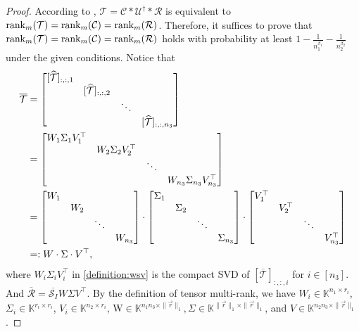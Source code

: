 \documentclass[twoside,12pt]{article}
\def\rank{\textnormal{rank}}
\def\X{\mathcal{T}}
\def\mcR{\mathcal{R}}
\def\mcC{\mathcal{C}}
\def\rank{\textnormal{rank}}
\def\X{\mathcal{T}}
\def\mcR{\mathcal{R}}
\def\mcC{\mathcal{C}}
\begin{document}
\begin{proof}
According to ,   $\mathcal{T}=\mcC*\mathcal{U}^\dagger*\mcR$ is equivalent to  $ \rank_m(\X)=\rank_m(\mcC)=\rank_m(\mcR)$. 
Therefore, it suffices to prove that $\rank_m(\X)=\rank_m(\mcC)=\rank_m(\mcR)$ holds with probability at least $1-\frac{1}{n_1^{\beta_1}}-\frac{1}{n_2^{\beta_2}}$ under the given conditions.  Notice that 
\begin{align}
\overline{\mathcal{T}} &= \begin{bmatrix}
 [\widehat{\mathcal{T}}]_{:,:,1}&&&\\
 &[\widehat{\mathcal{T}}]_{:,:,2}&&\\
 &&\ddots&\\
 &&&[\widehat{\mathcal{T}}]_{:,:,n_3}
\end{bmatrix} \notag\\
& =\begin{bmatrix}
W_{1} \Sigma_{1}  V_{1}^{\top}&&&\\
 &W_{2} \Sigma_{2} V_{2}^{\top}&&\\
&&\ddots&\\
 &&&W_{n_3} \Sigma_{n_3} V_{n_3}^{\top}
\end{bmatrix}\label{definition:wsv}\\
& =\begin{bmatrix}
W_1&&&\\
 &W_{2} &&\\
&&\ddots&\\
 &&&W_{n_3} 
\end{bmatrix}\cdot \begin{bmatrix}
\Sigma_{1}&&&\\
 &\Sigma_{2} &&\\
 &&\ddots&\\
 &&&\Sigma_{n_3} 
\end{bmatrix}\cdot\begin{bmatrix}
V_{1}^{\top}&&&\\
 &V_{2}^{\top} &&\\
 &&\ddots&\\
 &&&V_{n_3}^{\top} 
\end{bmatrix}\notag\\
&=: W \cdot \Sigma \cdot V^{\top},\notag
\end{align}
 where  $W_i \Sigma_{i}  V_{i}^{\top}$ in \eqref{definition:wsv} is the compact SVD of  $[\overline{\mathcal{T}}]_{:,:,i}$ for $i\in[n_3]$. And $\overline{\mcR}=\overline{\mathcal{S}_I}W\Sigma V^{\top}$. 
By the definition of tensor multi-rank,  we have $W_i\in\mathbb{K}^{n_1\times r_i}$, $\Sigma_i\in\mathbb{K}^{r_i\times r_i}$, $V_i\in\mathbb{K}^{n_2\times r_i}$,  $\mathrm{W} \in \mathbb{K}^{n_{1}n_{3}\times \|\vec{r}\|_1}, \Sigma \in \mathbb{K}^{\|\vec{r}\|_1\times \|\vec{r}\|_1}$, and $V \in \mathbb{K}^{n_{2}n_{3}\times \|\vec{r}\|_1}$. 


\end{proof}
\end{document}
